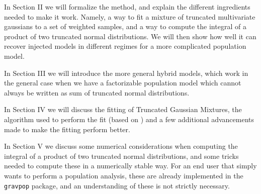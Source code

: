 \documentclass[twocolumn,usenames,dvipsnames,linenumbers]{aastex631}
\begin{document}
In Section II we will formalize the method, and explain the different ingredients needed to make it work. Namely, a way to fit a mixture of truncated multivariate gaussians to a set of weighted samples, and a way to compute the integral of a product of two truncated normal distributions. We will then show how well it can recover injected models in different regimes for a more complicated population model.

In Section III we will introduce the more general hybrid models, which work in the general case when we have a factorizable population model which cannot always be written as sum of truncated normal distributions.

In Section IV we will discuss the fitting of Truncated Gaussian Mixtures, the algorithm used to perform the fit (based on \cite{Lee2012}) and a few additional advancements made to make the fitting perform better. 

In Section V we discuss some numerical considerations when computing the integral of a product of two truncated normal distributions, and some tricks needed to compute these in a numerically stable way. For an end user that simply wants to perform a population analysis, these are already implemented in the \texttt{gravpop} package, and an understanding of these is not strictly necessary.
\end{document}
